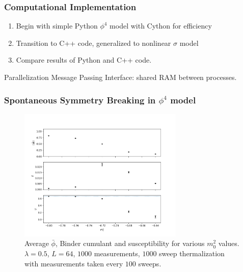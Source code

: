 \documentclass{beamer}
\begin{document}
\begin{frame}
    \frametitle{Computational Implementation}
    \begin{enumerate}
        \item Begin with simple Python $\phi^4$ model with Cython for efficiency
        \item Transition to C++ code, generalized to nonlinear $\sigma$ model
        \item Compare results of Python and C++ code.
    \end{enumerate}
    \begin{block}{Parallelization}
        Message Passing Interface: shared RAM between processes.
    \end{block}
\end{frame}




\begin{frame}
\frametitle{Spontaneous Symmetry Breaking in $\phi^4$ model}
\begin{figure}[h]
  \centering
      \includegraphics[width=0.7\textwidth]{imgs/phi4.png}
      \caption{Average $\bar\phi$, Binder cumulant and susceptibility for various $m_0^2$ values. $\lambda=0.5$, $L=64$, $1000$ measurements, $1000$ sweep thermalization with measurements taken every $100$ sweeps.}
  \label{fig:flow}
\end{figure}
\end{frame}
\end{document}
